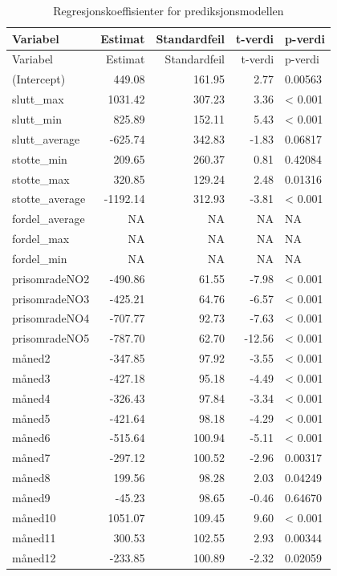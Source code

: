 \documentclass[
  letterpaper,
  DIV=11,
  numbers=noendperiod]{scrartcl}
\begin{document}
\begin{longtable}[]{@{}lrrrl@{}}
\caption{Regresjonskoeffisienter for prediksjonsmodellen}\tabularnewline
\toprule\noalign{}
Variabel & Estimat & Standardfeil & t-verdi & p-verdi \\
\midrule\noalign{}
\endfirsthead
\toprule\noalign{}
Variabel & Estimat & Standardfeil & t-verdi & p-verdi \\
\midrule\noalign{}
\endhead
\bottomrule\noalign{}
\endlastfoot
(Intercept) & 449.08 & 161.95 & 2.77 & 0.00563 \\
slutt\_max & 1031.42 & 307.23 & 3.36 & \textless{} 0.001 \\
slutt\_min & 825.89 & 152.11 & 5.43 & \textless{} 0.001 \\
slutt\_average & -625.74 & 342.83 & -1.83 & 0.06817 \\
stotte\_min & 209.65 & 260.37 & 0.81 & 0.42084 \\
stotte\_max & 320.85 & 129.24 & 2.48 & 0.01316 \\
stotte\_average & -1192.14 & 312.93 & -3.81 & \textless{} 0.001 \\
fordel\_average & NA & NA & NA & NA \\
fordel\_max & NA & NA & NA & NA \\
fordel\_min & NA & NA & NA & NA \\
prisomradeNO2 & -490.86 & 61.55 & -7.98 & \textless{} 0.001 \\
prisomradeNO3 & -425.21 & 64.76 & -6.57 & \textless{} 0.001 \\
prisomradeNO4 & -707.77 & 92.73 & -7.63 & \textless{} 0.001 \\
prisomradeNO5 & -787.70 & 62.70 & -12.56 & \textless{} 0.001 \\
måned2 & -347.85 & 97.92 & -3.55 & \textless{} 0.001 \\
måned3 & -427.18 & 95.18 & -4.49 & \textless{} 0.001 \\
måned4 & -326.43 & 97.84 & -3.34 & \textless{} 0.001 \\
måned5 & -421.64 & 98.18 & -4.29 & \textless{} 0.001 \\
måned6 & -515.64 & 100.94 & -5.11 & \textless{} 0.001 \\
måned7 & -297.12 & 100.52 & -2.96 & 0.00317 \\
måned8 & 199.56 & 98.28 & 2.03 & 0.04249 \\
måned9 & -45.23 & 98.65 & -0.46 & 0.64670 \\
måned10 & 1051.07 & 109.45 & 9.60 & \textless{} 0.001 \\
måned11 & 300.53 & 102.55 & 2.93 & 0.00344 \\
måned12 & -233.85 & 100.89 & -2.32 & 0.02059 \\
\end{longtable}
\end{document}
